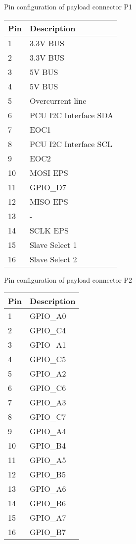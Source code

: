 \begin{appendix}
	\caption{Pin configuration of payload  connector P1}
	\begin{center}
		
		
		\begin{tabular}{p{3cm}p{4cm}}
			\toprule
			
			Pin & Description \\ \midrule
			1 & 3.3V BUS \\ 
			2 & 3.3V BUS \\ 
			3 & 5V BUS \\ 
			4 & 5V BUS \\ 
			5 & Overcurrent line \\ 
			6 & PCU I2C Interface SDA \\ 
			7 & EOC1 \\ 
			8 & PCU I2C Interface SCL \\ 
			9 & EOC2 \\ 
			10 & MOSI EPS \\ 
			11 & GPIO\_D7 \\ 
			12 & MISO EPS \\ 
			13 & - \\ 
			14 & SCLK EPS \\ 
			15 & Slave Select 1 \\ 
			16 & Slave Select 2 \\ 
			\bottomrule
		\end{tabular}
		\label{P1}
	\end{center}
	
		\caption{Pin configuration of payload  connector P2}
		\begin{center}
			
			
			\begin{tabular}{p{3cm}p{4cm}}
				\toprule
				
				Pin & Description \\ \midrule
				1 & GPIO\_A0 \\ 
				2 & GPIO\_C4 \\ 
				3 & GPIO\_A1 \\ 
				4 & GPIO\_C5 \\ 
				5 & GPIO\_A2 \\ 
				6 & GPIO\_C6 \\ 
				7 & GPIO\_A3 \\ 
				8 & GPIO\_C7 \\ 
				9 & GPIO\_A4 \\ 
				10 & GPIO\_B4 \\ 
				11 & GPIO\_A5 \\ 
				12 & GPIO\_B5 \\ 
				13 & GPIO\_A6 \\ 
				14 & GPIO\_B6 \\ 
				15 & GPIO\_A7 \\ 
				16 & GPIO\_B7 \\ 
				\bottomrule
			\end{tabular}
			\label{P2}
		\end{center}
	

\end{appendix}
